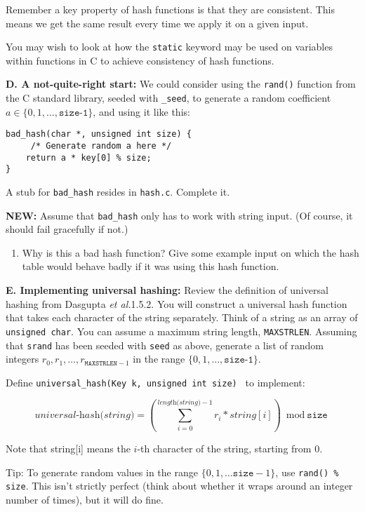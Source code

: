 \documentclass[11pt]{article}
\newcommand{\size}{{\texttt{size}}}
\begin{document}
Remember a key property of hash functions is that they are consistent.
This means we get the same result every time we apply it on a given input.

You may wish to look at how the \texttt{static} keyword may be used on variables
within functions in C to achieve consistency of hash functions.

\begin{description}
    \item {\bf D. A not-quite-right start:}
        We could consider using the \texttt{rand()} function from the C standard library,
        seeded with \texttt{\_seed},
        to generate a random coefficient $a \in \{0, 1, \ldots,
        \texttt{size-1}\}$,
        and using it like this:

\begin{verbatim}
bad_hash(char *, unsigned int size) {
     /* Generate random a here */
    return a * key[0] % size;
}
\end{verbatim}

        A stub for \texttt{bad\_hash} resides in \texttt{hash.c}.  Complete it.

{\bf NEW\@: } Assume that \texttt{bad\_hash} only has to work with string input.  (Of course, it should fail gracefully if not.)

\end{description}

\begin{enumerate}[resume]
    \item Why is this a bad hash function?
        Give some example input on which the hash table would behave badly if it was using this hash function.
\end{enumerate}

\begin{description}
    \item {\bf E. Implementing universal hashing: }
        Review the definition of universal hashing from Dasgupta {\it et al.}\/1.5.2.
        You will construct a universal hash function that takes each character of the string separately.
        Think of a string as an array of \texttt{unsigned char}.
        You can assume a maximum string length, \texttt{MAXSTRLEN}.
        Assuming that \texttt{srand} has been seeded with \texttt{seed} as above,
        generate a list of random integers $r_0, r_1, \ldots, r_{\texttt{MAXSTRLEN}-1}$
        in the range $\{0,1,\ldots,\texttt{size-1}\}$.

        Define \texttt{universal\_hash(Key k, unsigned int size) } to implement:

        $$\textit{universal-hash(string)} = \left( \sum_{i=0}^{ \textit{length(string)}-1} r_i * string[i] \right) \bmod \size $$

        Note that string[i] means the $i$-th character of the string,
        starting from 0.

        Tip: To generate random values in the range $\{0,1, \ldots \texttt{size}-1 \}$,
        use \texttt{rand() \%  size}.
        This isn't strictly perfect (think about whether it wraps around an integer number of times),
        but it will do fine.
\end{description}
\end{document}
